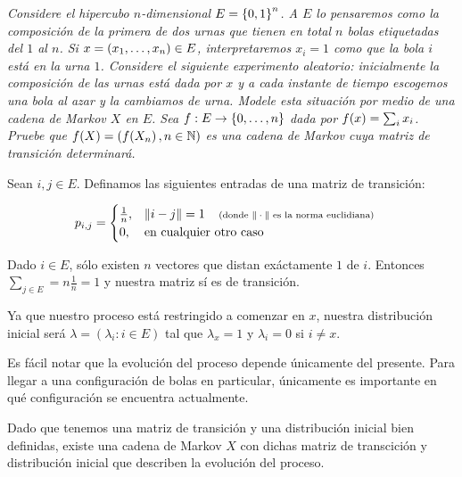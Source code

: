 \emph{
	Considere el hipercubo $n$-dimensional $E=\left\{ 0,1\right\} ^n$. A $E$ lo pensaremos como la composici\'on 
	de la primera de dos urnas que tienen en total $n$ bolas etiquetadas del $1$ al $n$. 
	Si $x=\left( x_1,\ldots, x_n\right) \in E$, interpretaremos $x_i=1$ como que la bola $i$ est\'a en la urna $1$. 
	Considere el siguiente experimento aleatorio: inicialmente la composici\'on de las urnas est\'a dada por 
	$x$ y a cada instante de tiempo escogemos una bola al azar y la cambiamos de urna. 
	Modele esta situaci\'on por medio de una cadena de Markov $X$ en $E$. Sea $f:E\to \left\{ 0,\ldots, n\right\} $ 
	dada por $f\!\left( x\right) =\sum_i x_i$. Pruebe que $f\!\left( X\right) =\left( f\!\left( X_n\right) ,n\in\mathbb{N}\right) $ es una cadena de 
	Markov cuya matriz de transici\'on determinar\'a.
}
\afterstatement\par\null

Sean $i,j \in E$. Definamos las siguientes entradas de una matriz de transición:

\begin{align}
        p_{i,j} &=   
                    \begin{cases}
                        \frac{1}{n},    &       \|i-j\| = 1 \;\;\;\;\mbox{{\scriptsize(donde $\|\cdot\|$ es la norma euclidiana)}}  \\
                        0,              &       \text{en cualquier otro caso}
                    \end{cases}
\end{align}

Dado $i \in E$, sólo existen $n$ vectores que distan exáctamente $1$ de $i$. Entonces 
$\sum_{j \in E} = n \frac{1}{n} = 1$ y nuestra matriz sí es de transición.\par\null

Ya que nuestro proceso está restringido a comenzar en $x$, nuestra distribución inicial
será $\lambda = (\lambda_i : i \in E)$ tal que $\lambda_x = 1$ y $\lambda_i = 0$ si $i \not= x$.\par\null

Es fácil notar que la evolución del proceso depende únicamente del presente. Para llegar a una configuración
de bolas en particular, únicamente es importante en qué configuración se encuentra actualmente.\par\null

Dado que tenemos una matriz de transición y una distribución inicial bien definidas, existe una cadena de
Markov $X$ con dichas matriz de transcición y distribución inicial que describen la evolución del proceso.\par\null

